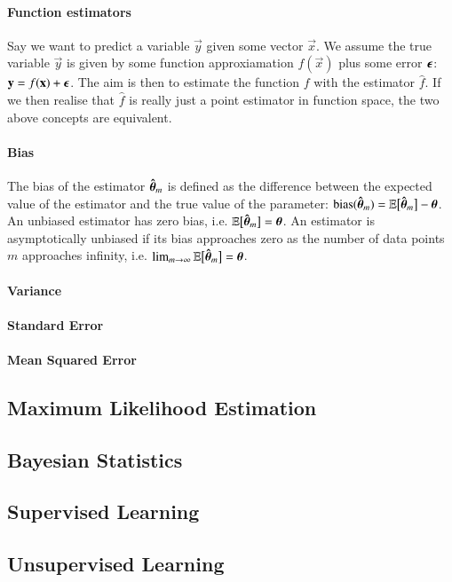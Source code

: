         \paragraph{Function estimators}
        Say we want to predict a variable $\vec{y}$ given some vector $\vec{x}$. We assume the true variable $\vec{y}$ is given by some function approxiamation $f(\vec{x})$ plus some error $\boldsymbol{\epsilon}$: $\mathbf{y} = f(\mathbf{x}) + \boldsymbol{\epsilon}$. The aim is then to estimate the function $f$ with the estimator $\hat{f}$. If we then realise that $\hat{f}$ is really just a point estimator in function space, the two above concepts are equivalent.

        \paragraph{Bias}
        The bias of the estimator $\boldsymbol{\hat{\theta}}_m$ is defined as the difference between the expected value of the estimator and the true value of the parameter: $\text{bias}(\boldsymbol{\hat{\theta}}_m) = \mathbb{E}\big[\boldsymbol{\hat{\theta}}_m\big] - \boldsymbol{\theta}$. An unbiased estimator has zero bias, i.e. $\mathbb{E}\big[\boldsymbol{\hat{\theta}}_m\big] = \boldsymbol{\theta}$. An estimator is asymptotically unbiased if its bias approaches zero as the number of data points $m$ approaches infinity, i.e. $\lim_{m\to\infty} \mathbb{E}\big[\boldsymbol{\hat{\theta}}_m\big] = \boldsymbol{\theta}$.

        \paragraph{Variance}

        \paragraph{Standard Error}

        \paragraph{Mean Squared Error}


    \subsection{Maximum Likelihood Estimation}
    \subsection{Bayesian Statistics}
    \subsection{Supervised Learning}
    \subsection{Unsupervised Learning}
